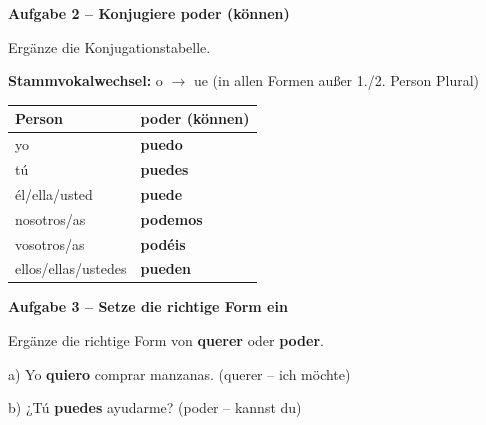 \documentclass[11pt, a4paper]{article}
\newcommand{\fachfarbe}{spanisch}
\newcommand{\punktebox}[1]{\hfill\fbox{\small \_/#1}}
\newcommand{\lsg}[1]{\textcolor{loesung}{\textbf{#1}}}
\newenvironment{aufgabe}[1]{%
    \needspace{5\baselineskip}%
    \nopagebreak[4]%
    \vspace{10pt}
    \noindent\textbf{\textcolor{\fachfarbe}{Aufgabe #1}}
    \nopagebreak[4]%
    \vspace{5pt}
    \nopagebreak[4]%
    \begin{list}{}{\leftmargin=0pt}
    \item[]
}{%
    \end{list}
}
\newcommand{\es}[1]{\textcolor{\fachfarbe}{\textbf{#1}}}
\begin{document}
\vspace{15pt}


\begin{aufgabe}{2 -- Konjugiere \es{poder} (können)}
Ergänze die Konjugationstabelle. \punktebox{6}
\end{aufgabe}

\begin{hinweis}
\textbf{Stammvokalwechsel:} o $\rightarrow$ ue (in allen Formen außer 1./2. Person Plural)
\end{hinweis}

\vspace{0.5em}

\noindent
\begin{tabularx}{\textwidth}{|l|X|}
\hline
\textbf{Person} & \textbf{poder (können)} \\
\hline
yo & \lsg{puedo} \\[0.5em]
\hline
tú & \lsg{puedes} \\[0.5em]
\hline
él/ella/usted & \lsg{puede} \\[0.5em]
\hline
nosotros/as & \lsg{podemos} \\[0.5em]
\hline
vosotros/as & \lsg{podéis} \\[0.5em]
\hline
ellos/ellas/ustedes & \lsg{pueden} \\[0.5em]
\hline
\end{tabularx}

\vspace{15pt}


\begin{aufgabe}{3 -- Setze die richtige Form ein}
Ergänze die richtige Form von \es{querer} oder \es{poder}. \punktebox{8}
\end{aufgabe}

\noindent
a) Yo \lsg{quiero} comprar manzanas. \hfill (querer -- ich möchte)

\vspace{0.8em}

\noindent
b) ¿Tú \lsg{puedes} ayudarme? \hfill (poder -- kannst du)

\vspace{0.8em}
\end{document}
